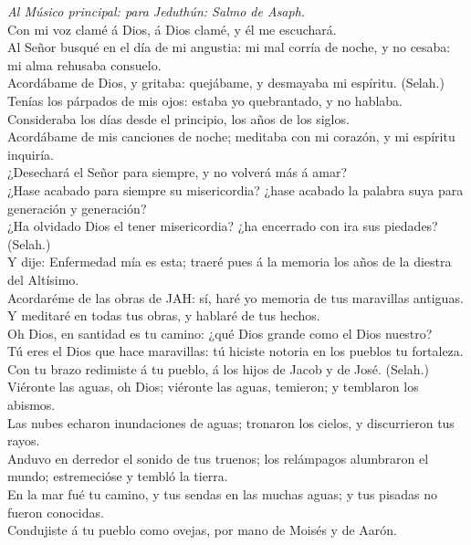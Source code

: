  \emph{Al Músico principal: para Jeduthún: Salmo de
Asaph.}\\
Con mi voz clamé á Dios, á Dios clamé, y él me escuchará.\\
 Al Señor busqué en el día de mi angustia: mi mal corría de
noche, y no cesaba: mi alma rehusaba consuelo.\\
 Acordábame de Dios, y gritaba: quejábame, y desmayaba mi
espíritu. (Selah.)\\
 Tenías los párpados de mis ojos: estaba yo quebrantado, y
no hablaba.\\
 Consideraba los días desde el principio, los años de los
siglos.\\
 Acordábame de mis canciones de noche; meditaba con mi
corazón, y mi espíritu inquiría.\\
 ¿Desechará el Señor para siempre, y no volverá más á
amar?\\
 ¿Hase acabado para siempre su misericordia? ¿hase acabado
la palabra suya para generación y generación?\\
 ¿Ha olvidado Dios el tener misericordia? ¿ha encerrado con
ira sus piedades? (Selah.)\\
 Y dije: Enfermedad mía es esta; traeré pues á la memoria
los años de la diestra del Altísimo.\\
 Acordaréme de las obras de JAH: sí, haré yo memoria de tus
maravillas antiguas.\\
 Y meditaré en todas tus obras, y hablaré de tus hechos.\\
 Oh Dios, en santidad es tu camino: ¿qué Dios grande como
el Dios nuestro?\\
 Tú eres el Dios que hace maravillas: tú hiciste notoria en
los pueblos tu fortaleza.\\
 Con tu brazo redimiste á tu pueblo, á los hijos de Jacob y
de José. (Selah.)\\
 Viéronte las aguas, oh Dios; viéronte las aguas, temieron;
y temblaron los abismos.\\
 Las nubes echaron inundaciones de aguas; tronaron los
cielos, y discurrieron tus rayos.\\
 Anduvo en derredor el sonido de tus truenos; los
relámpagos alumbraron el mundo; estremecióse y tembló la tierra.\\
 En la mar fué tu camino, y tus sendas en las muchas aguas;
y tus pisadas no fueron conocidas.\\
 Condujiste á tu pueblo como ovejas, por mano de Moisés y
de Aarón.


